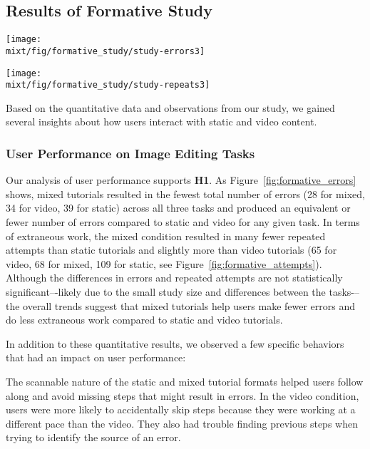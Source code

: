 \subsection{Results of Formative Study}

\begin{figure*}[t]
  \centering
  \texttt{[image: \\mixt/fig/formative\_study/study-errors3]}
  \caption{Users tied for fewer errors with mixed tutorials.}
  \label{fig:formative_errors}
\end{figure*}

\begin{figure*}[t]
  \centering
  \texttt{[image: \\mixt/fig/formative\_study/study-repeats3]}
  \caption{In two of three tasks, participants made more repeated attempts at executing steps with static tutorials than with mixed tutorials. Video tutorials had the fewest attempts.}
  \label{fig:formative_attempts}
\end{figure*}

Based on the quantitative data and observations from our study, we gained several insights about how users interact with static and video content.

\subsubsection{User Performance on Image Editing Tasks}
Our analysis of user performance supports \textbf{H1}. As Figure~\ref{fig:formative_errors} shows, mixed tutorials resulted in the fewest total number of errors (28 for mixed, 34 for video, 39 for static) across all three tasks and produced an equivalent or fewer number of errors compared to static and video for any given task. In terms of extraneous work, the mixed condition resulted in many fewer repeated attempts than static tutorials and slightly more than video tutorials (65 for video, 68 for mixed, 109 for static, see Figure~\ref{fig:formative_attempts}). Although the differences in errors and repeated attempts are not statistically significant–-likely due to the small study size and differences between the tasks-–the overall trends suggest that mixed tutorials help users make fewer errors and do less extraneous work compared to static and video tutorials.

In addition to these quantitative results, we observed a few specific behaviors that had an impact on user performance:

The scannable nature of the static and mixed tutorial formats helped users follow along and avoid missing steps that might result in errors. In the video condition, users were more likely to accidentally skip steps because they were working at a different pace than the video. They also had trouble finding previous steps when trying to identify the source of an error.

